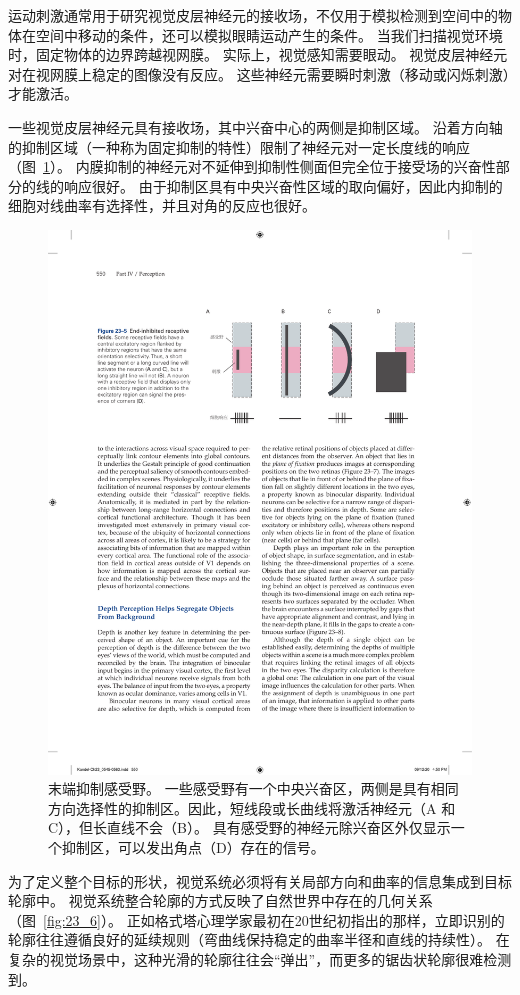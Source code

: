 运动刺激通常用于研究视觉皮层神经元的接收场，不仅用于模拟检测到空间中的物体在空间中移动的条件，还可以模拟眼睛运动产生的条件。
当我们扫描视觉环境时，固定物体的边界跨越视网膜。
实际上，视觉感知需要眼动。
视觉皮层神经元对在视网膜上稳定的图像没有反应。
这些神经元需要瞬时刺激（移动或闪烁刺激）才能激活。


一些视觉皮层神经元具有接收场，其中兴奋中心的两侧是抑制区域。
沿着方向轴的抑制区域（一种称为固定抑制的特性）限制了神经元对一定长度线的响应（图~\ref{fig:23_5}）。
内膜抑制的神经元对不延伸到抑制性侧面但完全位于接受场的兴奋性部分的线的响应很好。
由于抑制区具有中央兴奋性区域的取向偏好，因此内抑制的细胞对线曲率有选择性，并且对角的反应也很好。


\begin{figure}[htbp]
	\centering
	\includegraphics[width=0.85\linewidth]{chap23/fig_23_5}
	\caption{末端抑制感受野。
		一些感受野有一个中央兴奋区，两侧是具有相同方向选择性的抑制区。因此，短线段或长曲线将激活神经元（A 和 C），但长直线不会（B）。
		具有感受野的神经元除兴奋区外仅显示一个抑制区，可以发出角点（D）存在的信号。}
	\label{fig:23_5}
\end{figure}


为了定义整个目标的形状，视觉系统必须将有关局部方向和曲率的信息集成到目标轮廓中。
视觉系统整合轮廓的方式反映了自然世界中存在的几何关系（图~\ref{fig:23_6}）。
正如格式塔心理学家最初在20世纪初指出的那样，立即识别的轮廓往往遵循良好的延续规则（弯曲线保持稳定的曲率半径和直线的持续性）。
在复杂的视觉场景中，这种光滑的轮廓往往会“弹出”，而更多的锯齿状轮廓很难检测到。


